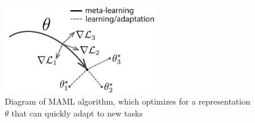 \begin{figure}[tb]
    \centering
    \includegraphics[width=0.6\textwidth]{figures/images/maml_weights.jpg}
    \caption{Diagram of MAML algorithm, which optimizes for a representation $\theta$ that can quickly adapt to new tasks}
    \label{fig:maml_weights}
\end{figure}

